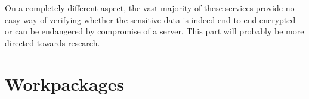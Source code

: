 \documentclass[a4paper, 12pt]{article}
\begin{document}
On a completely different aspect, the vast majority of these services provide no easy way of verifying whether the sensitive data is indeed end-to-end encrypted or can be endangered by compromise of a server. This part will probably be more directed towards research.

\section{Workpackages}

\end{document}
